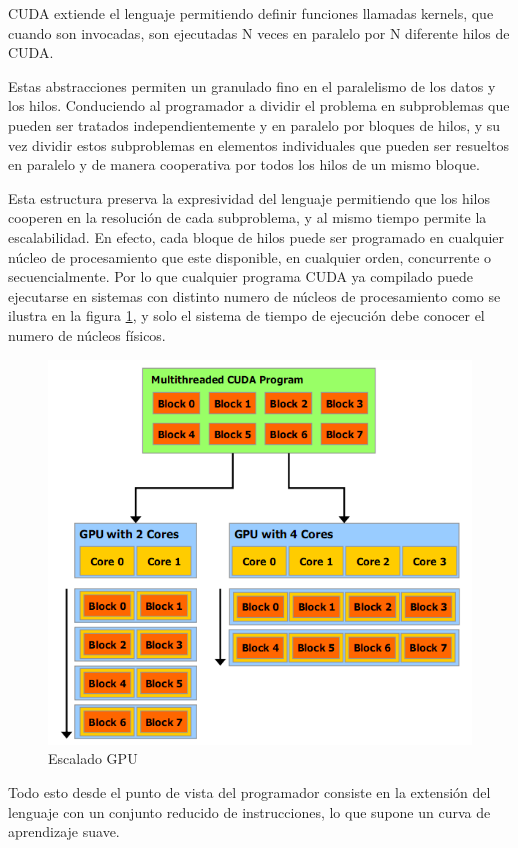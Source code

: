 \documentclass[twoside]{article}
\begin{document}
CUDA extiende el lenguaje permitiendo definir funciones llamadas kernels, que cuando son invocadas, son ejecutadas N veces en paralelo por N diferente hilos de CUDA.

Estas abstracciones permiten un granulado fino en el paralelismo de los datos y los hilos. Conduciendo al programador a dividir el problema en subproblemas que pueden ser tratados independientemente y en paralelo por bloques de hilos, y su vez dividir estos subproblemas en elementos individuales que pueden ser resueltos en paralelo y de manera cooperativa por todos los hilos de un mismo bloque.

Esta estructura preserva la expresividad del lenguaje permitiendo que los hilos cooperen en la resolución de cada subproblema, y al mismo tiempo permite la escalabilidad. En efecto, cada bloque de hilos puede ser programado en cualquier núcleo de procesamiento que este disponible, en cualquier orden, concurrente o secuencialmente. Por lo que cualquier programa CUDA ya compilado puede ejecutarse en sistemas con distinto numero de núcleos de procesamiento como se ilustra en la figura \ref{fig:EscaladoGPU}, y solo el sistema de tiempo de ejecución debe conocer el numero de núcleos físicos.

\begin{figure}
   \begin{center}
      \includegraphics[width=.5\textwidth]{EscaladoGPU.png}
      \caption{\label{fig:EscaladoGPU} Escalado GPU}
   \end{center}
\end{figure}

Todo esto desde el punto de vista del programador consiste en la extensión del lenguaje con un conjunto reducido de instrucciones, lo que supone un curva de aprendizaje suave.
\end{document}
